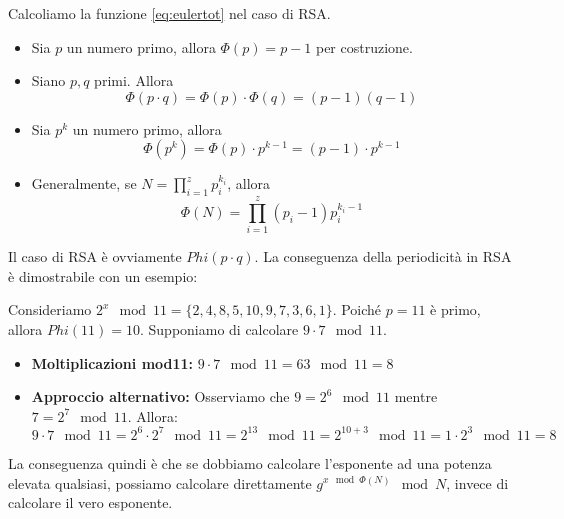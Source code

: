 Calcoliamo la funzione \cref{eq:eulertot} nel caso di RSA. 
\begin{itemize}
    \item Sia $p$ un numero primo, allora $\Phi(p)=p-1$ per costruzione.
    \item Siano $p,q$ primi. Allora \[\Phi(p\cdot{q})=\Phi(p)\cdot\Phi(q)=(p-1)(q-1)\]
    \item Sia $p^k$ un numero primo, allora 
    \[\Phi(p^k)=\Phi(p)\cdot p^{k-1}=(p-1)\cdot p^{k-1}\]
    \item Generalmente, se $N=\prod_{i=1}^{z}p_i^{k_i}$, allora
    \[\Phi(N)=\prod_{i=1}^{z}(p_i-1)p_i^{k_i-1}\]
\end{itemize}
Il caso di RSA è ovviamente $Phi(p\cdot{q})$. La conseguenza della periodicità in RSA è dimostrabile con un esempio:
\begin{example}
Consideriamo $2^x\mod{11}=\{2,4,8,5,10,9,7,3,6,1\}$. Poiché $p=11$ è primo, allora $Phi(11)=10$. Supponiamo di calcolare $9\cdot7\mod11$.
\begin{itemize}
    \item \textbf{Moltiplicazioni mod11:} $9\cdot7\mod11=63\mod11=8$
    \item \textbf{Approccio alternativo:} Osserviamo che $9=2^6\mod11$ mentre $7=2^7\mod11$. Allora:
    \[9\cdot7\mod11=2^6\cdot2^7\mod11=2^{13}\mod11=2^{10+3}\mod11=1\cdot2^3\mod11=8\]
\end{itemize}
\begin{remark}
La conseguenza quindi è che se dobbiamo calcolare l'esponente ad una potenza elevata qualsiasi, possiamo calcolare direttamente $g^{x\mod\Phi(N)}\mod N$, invece di calcolare il vero esponente.
\end{remark}
\end{example}
